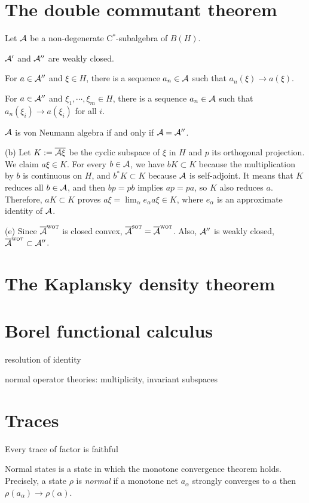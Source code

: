 \documentclass{../note}
\newcommand{\wot}{{\text{\sc wot}}}
\newcommand{\sot}{{\text{\sc sot}}}
\begin{document}
\section{The double commutant theorem}

\begin{thm}
Let $\mathcal{A}$ be a non-degenerate C$^*$-subalgebra of $B(H)$.
\begin{parts}
\item $\mathcal{A}'$ and $\mathcal{A}''$ are weakly closed.
\item For $a\in\mathcal{A}''$ and $\xi\in H$, there is a sequence $a_n\in\mathcal{A}$ such that $a_n(\xi)\to a(\xi)$.
\item For $a\in\mathcal{A}''$ and $\xi_1,\cdots,\xi_m\in H$, there is a sequence $a_n\in\mathcal{A}$ such that $a_n(\xi_i)\to a(\xi_i)$ for all $i$.
\item $\mathcal{A}$ is von Neumann algebra if and only if $\mathcal{A}=\mathcal{A}''$.
\end{parts}
\end{thm}
\begin{pf}
(b)
Let $K:=\overline{\mathcal{A}\xi}$ be the cyclic subspace of $\xi$ in $H$ and $p$ its orthogonal projection.
We claim $a\xi\in K$.
For every $b\in\mathcal{A}$, we have $bK\subset K$ because the multiplication by $b$ is continuous on $H$, and $b^*K\subset K$ because $\mathcal{A}$ is self-adjoint.
It means that $K$ reduces all $b\in\mathcal{A}$, and then $bp=pb$ implies $ap=pa$, so $K$ also reduces $a$.
Therefore, $aK\subset K$ proves $a\xi=\lim_\alpha e_\alpha a\xi\in K$, where $e_\alpha$ is an approximate identity of $\mathcal{A}$.

(e)
Since $\bar\cA^\wot$ is closed convex, $\bar\cA^\sot=\bar\cA^\wot$.
Also, $\mathcal{A}''$ is weakly closed, $\bar\cA^\wot\subset\cA''$.
\end{pf}


\section{The Kaplansky density theorem}

\section{Borel functional calculus}
resolution of identity

normal operator theories: multiplicity, invariant subspaces

\section{Traces}
Every trace of factor is faithful


\begin{prb}
Normal states is a state in which the monotone convergence theorem holds.
Precisely, a state $\rho$ is \emph{normal} if a monotone net $a_\alpha$ strongly converges to $a$ then $\rho(a_\alpha)\to\rho(\alpha)$.
\end{prb}
\end{document}
